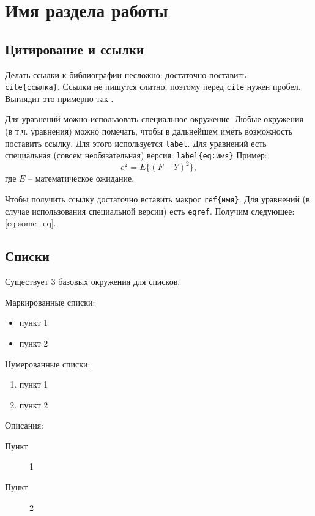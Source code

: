 
\section{Имя раздела работы}

\subsection{Цитирование и ссылки}
Делать ссылки к библиографии несложно: достаточно поставить \texttt{\\cite\{ссылка\}}. Ссылки не пишутся слитно, поэтому перед \texttt{cite} нужен пробел. Выглядит это примерно так \cite{test}.

Для уравнений можно использовать специальное окружение. Любые окружения (в т.ч. уравнения) можно помечать, чтобы в дальнейшем иметь возможность поставить ссылку. Для этого используется \texttt{label}. Для уравнений есть специальная (совсем необязательная) версия: \texttt{label\{eq:имя\}} Пример:
\begin{equation}\label{eq:some_eq}
    e^2 = E\{(F - Y)^2\},
\end{equation}
где $E$ -- математическое ожидание.

Чтобы получить ссылку достаточно вставить макрос \texttt{ref\{имя\}}. Для уравнений (в случае использования специальной версии) есть \texttt{eqref}. Получим следующее: \eqref{eq:some_eq}.

\subsection{Списки}

Существует 3 базовых окружения для списков.

Маркированные списки:
\begin{itemize}
    \item пункт 1
    \item пункт 2
\end{itemize}

Нумерованные списки:
\begin{enumerate}
    \item пункт 1
    \item пункт 2
\end{enumerate}

Описания:
\begin{description}
    \item[Пункт] 1
    \item[Пункт] 2
\end{description}

